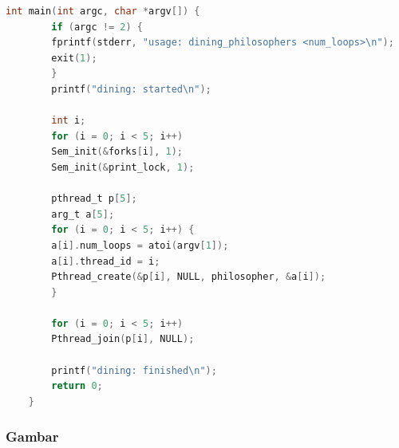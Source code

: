 \documentclass[11pt,a4paper]{article}
\begin{document}
\begin{lstlisting}[language=C, caption=Captionnya tulis di sini class,label={labelkode}]
    int main(int argc, char *argv[]) {
        if (argc != 2) {
	    fprintf(stderr, "usage: dining_philosophers <num_loops>\n");
	    exit(1);
        }
        printf("dining: started\n");
    
        int i;
        for (i = 0; i < 5; i++) 
	    Sem_init(&forks[i], 1);
        Sem_init(&print_lock, 1);

        pthread_t p[5];
        arg_t a[5];
        for (i = 0; i < 5; i++) {
	    a[i].num_loops = atoi(argv[1]);
	    a[i].thread_id = i;
	    Pthread_create(&p[i], NULL, philosopher, &a[i]);
        }

        for (i = 0; i < 5; i++) 
	    Pthread_join(p[i], NULL); 

        printf("dining: finished\n");
        return 0;
    }
    \end{lstlisting}
\subsubsection{Gambar}
\end{document}
